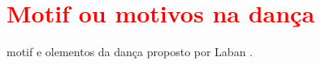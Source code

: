 \section{\textcolor{red}{Motif ou motivos na dança }}

motif e olementos da dança proposto por Laban \cite[pp. 46]{paine2014complete}.
